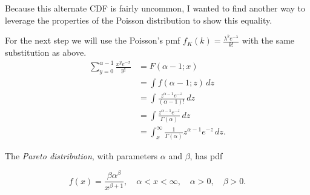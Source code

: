 \documentclass[12pt,letterpaper]{exam}
\begin{document}
\begin{questions}
\begin{solution}
		Because this alternate CDF is fairly uncommon, I wanted to find another way to leverage the properties of
		the Poisson distribution to show this equality.
		
		For the next step we will use the Poisson's pmf 
		\(f_K(k) = \frac{\lambda^k e^{-\lambda}}{k!} \) 
		with the same substitution as above.				
		\begin{align*}
			\sum_{y=0}^{\alpha-1} \frac{x^y e^{-x}}{y!}
			&= F(\alpha -1 ; x) \\
			&= \int f(\alpha -1 ; z) \,dz \\
			&= \int \frac{z^{\alpha-1} e^{-z}}{(\alpha-1)!} \,dz \\
			&= \int \frac{z^{\alpha-1} e^{-z}}{\Gamma(\alpha)} \,dz \\
			&= \int_{x}^{\infty} \frac{1}{\Gamma(\alpha)} z^{\alpha-1}e^{-z} \,dz.
		\end{align*}
		
		
	\end{solution}
	\clearpage
	
	\setcounter{question}{22}
	\question 
	The \textit{Pareto distribution}, with parameters \(\alpha\) and \(\beta\), has pdf
	
	\[f(x) = \frac{\beta\alpha^\beta}{x^{\beta+1}}, \quad \alpha<x<\infty, \quad \alpha>0, \quad \beta>0.\]
	
	
	\begin{solution}
\end{solution}
\end{questions}
\end{document}
